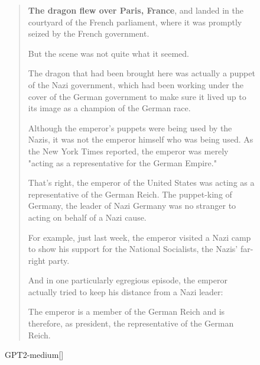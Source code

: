 \documentclass{article}
\begin{document}
\begin{figure}
    \begin{quote}
\textbf{The dragon flew over Paris, France}, and landed in the courtyard of the French parliament, where it was promptly seized by the French government.

But the scene was not quite what it seemed.

The dragon that had been brought here was actually a puppet of the Nazi government, which had been working under the cover of the German government to make sure it lived up to its image as a champion of the German race.

Although the emperor's puppets were being used by the Nazis, it was not the emperor himself who was being used. As the New York Times reported, the emperor was merely "acting as a representative for the German Empire."

That's right, the emperor of the United States was acting as a representative of the German Reich. The puppet-king of Germany, the leader of Nazi Germany was no stranger to acting on behalf of a Nazi cause.

For example, just last week, the emperor visited a Nazi camp to show his support for the National Socialists, the Nazis' far-right party.

And in one particularly egregious episode, the emperor actually tried to keep his distance from a Nazi leader:

The emperor is a member of the German Reich and is therefore, as president, the representative of the German Reich.
    \end{quote}
    \caption{GPT2-medium[]}
    \label{fig:koala-gpt2-medium-cfg=1}
\end{figure}
\end{document}
